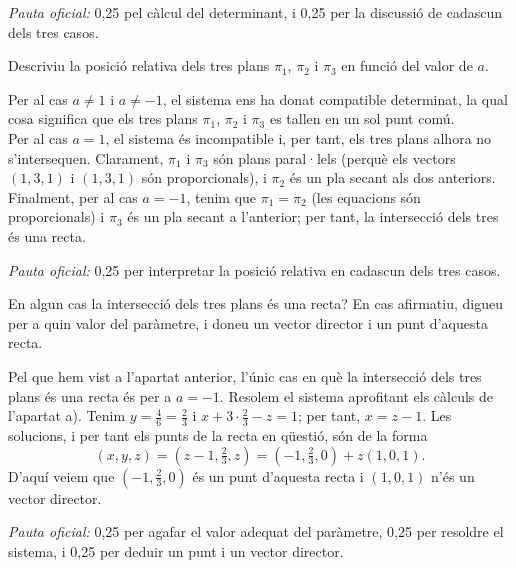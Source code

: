 \begin{apartats}
\begin{solucio}
\textit{Pauta oficial:} 0,25 pel càlcul del determinant, i 0,25 per la discussió de cadascun dels tres casos.
\end{solucio}

Descriviu la posició relativa dels tres plans $\pi_1$, $\pi_2$ i $\pi_3$ en funció del valor de $a$.

\begin{solucio}
Per al cas $a\neq1$ i $a\neq-1$, el sistema ens ha donat compatible determinat, la qual cosa significa que els
tres plans $\pi_1$, $\pi_2$ i $\pi_3$ es tallen en un sol punt comú.\\
Per al cas $a=1$, el sistema és incompatible i, per tant, els tres plans alhora no s'intersequen. Clarament,
$\pi_1$ i $\pi_3$ són plans paral·lels (perquè els vectors $(1,3,1)$ i $(1,3,1)$ són proporcionals), i $\pi_2$
és un pla secant als dos anteriors.\\
Finalment, per al cas $a=-1$, tenim que $\pi_1=\pi_2$ (les equacions són proporcionals) i $\pi_3$ és un pla
secant a l'anterior; per tant, la intersecció dels tres és una recta.

\textit{Pauta oficial:} 0,25 per interpretar la posició relativa en cadascun dels tres casos.
\end{solucio}

En algun cas la intersecció dels tres plans és una recta? En cas afirmatiu, digueu per a quin valor del
paràmetre, i doneu un vector director i un punt d'aquesta recta.

\begin{solucio}
Pel que hem vist a l'apartat anterior, l'únic cas en què la intersecció dels tres plans és una recta és per a
$a=-1$. Resolem el sistema aprofitant els càlculs de l'apartat a). Tenim $y=\frac46=\frac23$ i
$x+3\cdot\frac23-z=1$; per tant, $x=z-1$. Les solucions, i per tant els punts de la recta en qüestió, són de
la forma
\[
(x,y,z)=\left(z-1,\tfrac23,z\right)=\left(-1,\tfrac23,0\right)+z(1,0,1).
\]
D'aquí veiem que $\left(-1,\frac23,0\right)$ és un punt d'aquesta recta i $(1,0,1)$ n'és un vector director.

\textit{Pauta oficial:} 0,25 per agafar el valor adequat del paràmetre, 0,25 per resoldre el sistema, i 0,25
per deduir un punt i un vector director.
\end{solucio}

\end{apartats}
